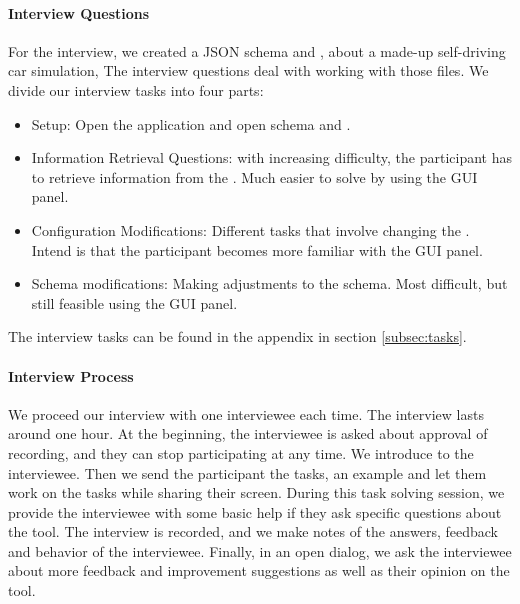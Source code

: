 \paragraph{Interview Questions}
For the interview, we created a JSON schema and \cfgfile{}, about a made-up self-driving car simulation,
The interview questions deal with working with those files.
We divide our interview tasks into four parts:
\begin{itemize}
    \item Setup: Open the application and open schema and \cfgfile.
    \item Information Retrieval Questions: with increasing difficulty, the participant has to retrieve information from the \cfgfile{}.
    Much easier to solve by using the GUI panel.
    \item Configuration Modifications: Different tasks that involve changing the \cfgfile{}.
    Intend is that the participant becomes more familiar with the GUI panel.
    \item Schema modifications: Making adjustments to the schema.
    Most difficult, but still feasible using the GUI panel.
\end{itemize}

The interview tasks can be found in the appendix in section \ref{subsec:tasks}.


\paragraph{Interview Process}
We proceed our interview with one interviewee each time.
The interview lasts around one hour.
At the beginning, the interviewee is asked about approval of recording, and they can stop participating at any time.
We introduce \toolname{} to the interviewee.
Then we send the participant the tasks, an example \cfgfile{} and let them work on the tasks while sharing their screen.
During this task solving session, we provide the interviewee with some basic help if they ask specific questions about the tool.
The interview is recorded, and we make notes of the answers, feedback and behavior of the interviewee.
Finally, in an open dialog, we ask the interviewee about more feedback and improvement suggestions as well as their opinion on the tool.


